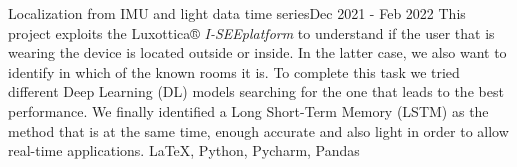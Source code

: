 %
%
%



\begin{projects}
    \projectNoLink
        {Localization from IMU and light data time series}{Dec 2021 - Feb 2022}
        {This project exploits the Luxottica® \textit{I-SEEplatform} to understand if the user that is wearing the device is located outside or inside. In the latter case, we also want to identify in which of the known rooms it is. To complete this task we tried different Deep Learning (DL) models searching for the one that leads to the best performance. We finally identified a Long Short-Term Memory (LSTM) as the method that is at the same time, enough accurate and also light in order to allow real-time applications.}
        {\LaTeX, Python, Pycharm, Pandas}
    	
	
				
    	
    	

\end{projects}
